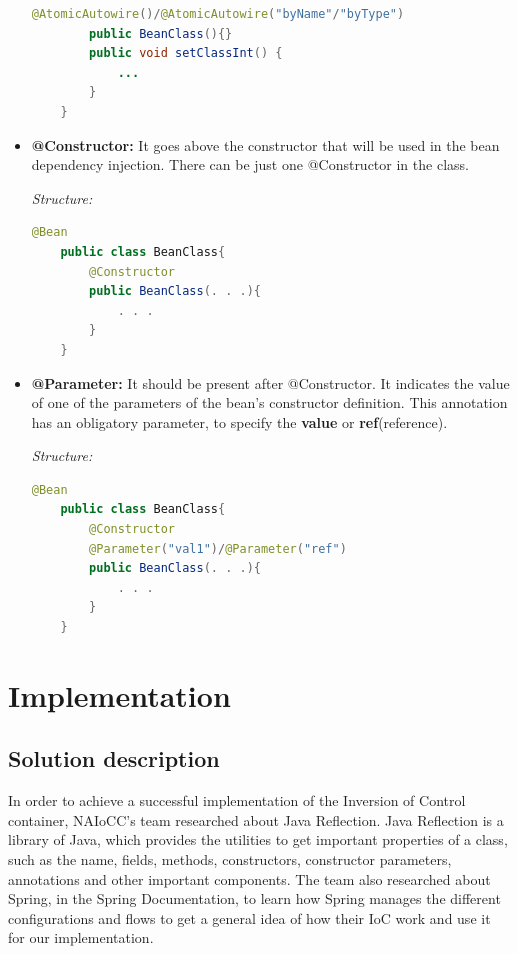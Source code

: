 \documentclass[a4paper, 12pt, notitlepage]{report}
\begin{document}
\begin{itemize}
\begin{lstlisting}[numbers = none, language = Java]
        @AtomicAutowire()/@AtomicAutowire("byName"/"byType")
        public BeanClass(){}
        public void setClassInt() {
            ...
        }
    }

    \end{lstlisting}
    
    \item \textbf{@Constructor:} It goes above the constructor that will be used in the bean dependency injection. There can be just one @Constructor in the class.
    
    \textit{Structure:}
    \begin{lstlisting}[numbers = none, language = Java]
    @Bean
    public class BeanClass{
	    @Constructor
	    public BeanClass(. . .){
	    	. . . 
        }
    }

    \end{lstlisting}
    \item \textbf{@Parameter:} It should be present after @Constructor. It indicates the value of one of the parameters of the bean's constructor definition. This annotation has an obligatory parameter, to specify the \textbf{value} or \textbf{ref}(reference).
    
    \textit{Structure:}
    \begin{lstlisting}[numbers = none, language = Java]
    @Bean
    public class BeanClass{
	    @Constructor
	    @Parameter("val1")/@Parameter("ref")
	    public BeanClass(. . .){
	    	. . . 
        }
    }
    \end{lstlisting}
\end{itemize}



\chapter{Implementation}
%
\section{Solution description}

In order to achieve a successful implementation of the Inversion of Control container, NAIoCC's team researched about Java Reflection. Java Reflection is a library of Java, which provides the utilities to get important properties of a class, such as the name, fields, methods, constructors, constructor parameters, annotations and other important components. The team also researched about Spring, in the Spring Documentation, to learn how Spring manages the different configurations and flows to get a general idea of how their IoC work and use it for our implementation. 
\end{document}
